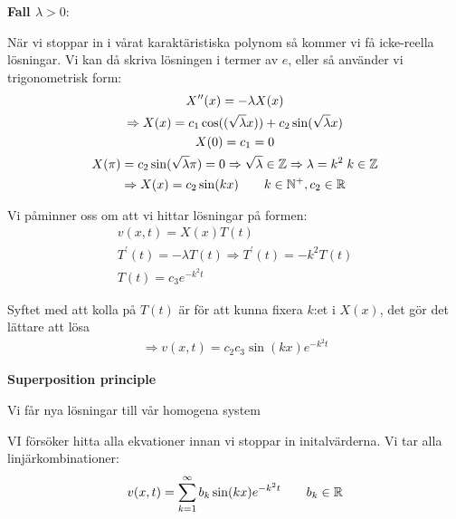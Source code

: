 \noindent\textbf{Fall $\lambda>0$}:
\par\bigskip
\noindent När vi stoppar in i vårat karaktäristiska polynom så kommer vi få icke-reella lösningar. Vi kan då skriva lösningen i termer av $e$, eller så använder vi trigonometrisk form: 
\begin{equation*}
  \begin{gathered}
    X^{\prime\prime}(x) = -\lambda X(x)\\
    \Rightarrow X(x) = c_1\cos((\sqrt{\lambda}x))+c_2\sin(\sqrt{\lambda}x)\\
    X(0) = c_1 = 0\\
    X(\pi) = c_2\sin(\sqrt{\lambda}\pi) = 0\Rightarrow\sqrt{\lambda}\in\mathbb{Z}\Rightarrow \lambda = k^2\;k\in\mathbb{Z}\\
    \Rightarrow X(x) = c_2\sin(kx)\qquad k\in\mathbb{N}^+, c_2\in\mathbb{R}
  \end{gathered}
\end{equation*}
\par\bigskip
\noindent Vi påminner oss om att vi hittar lösningar på formen:
\begin{equation*}
  \begin{gathered}
    v(x,t) = X(x)T(t)\\
    T^{\prime}(t) = -\lambda T(t)\Rightarrow T^{\prime}(t) = -k^2 T(t)\\
    T(t) = c_3e^{-k^2t}
  \end{gathered}
\end{equation*}\par
\noindent Syftet med att kolla på $T(t)$ är för att kunna fixera $k$:et i $X(x)$, det gör det lättare att lösa
\begin{equation*}
  \begin{gathered}
    \Rightarrow v(x,t) = c_2c_3\sin(kx)e^{-k^2t}
  \end{gathered}
\end{equation*}
\par\bigskip
\noindent\textbf{Superposition principle}\par
\noindent Vi får nya lösningar till vår homogena system\par
\noindent VI försöker hitta alla ekvationer innan vi stoppar in initalvärderna. Vi tar alla linjärkombinationer:
\begin{equation*}
  \begin{gathered}
    v(x,t) = \sum_{k=1}^{\infty} b_k\sin(kx)e^{-k^2t}\qquad b_k\in\mathbb{R}
  \end{gathered}
\end{equation*}
